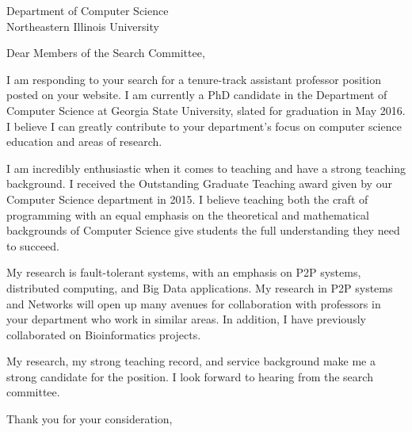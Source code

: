 \documentclass[12pt]{letter}
\date{}
\begin{document}
 
\begin{letter}{Department of Computer Science\\ Northeastern Illinois University} 
\opening{Dear Members of the Search Committee,} 
 
I am responding to your search for a tenure-track assistant professor position posted on your website.
I am currently a PhD candidate in the Department of Computer Science at Georgia State University, slated for graduation in May 2016.
I believe I can greatly contribute to your department's focus on computer science education and areas of research.


I am incredibly enthusiastic when it comes to teaching and have a strong teaching background.
I received the Outstanding Graduate Teaching award given by our Computer Science department in 2015.
I believe teaching both the craft of programming with an equal emphasis on the theoretical and mathematical backgrounds of Computer Science give students the full understanding they need to succeed.


My research is fault-tolerant systems, with an emphasis on P2P systems, distributed computing, and Big Data applications.
My research in P2P systems and Networks will open up many avenues for collaboration with professors in your department who work in similar areas.
In addition, I have previously collaborated on Bioinformatics projects.




My research, my strong teaching record, and service background make me a strong candidate for the position.
I look forward to hearing from the search committee.


\closing{Thank you for your consideration,} 
\end{letter} 
\end{document}
